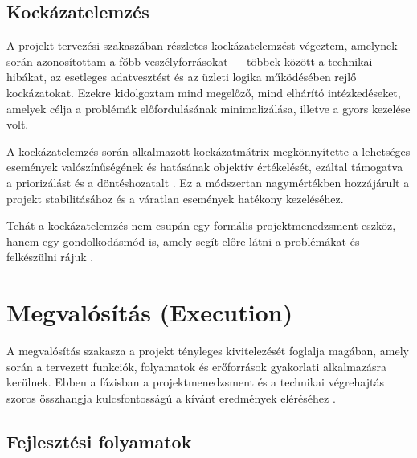 \subsection{Kockázatelemzés}

A projekt tervezési szakaszában részletes kockázatelemzést végeztem, amelynek során azonosítottam a főbb veszélyforrásokat — többek között a technikai hibákat, 
az esetleges adatvesztést és az üzleti logika működésében rejlő kockázatokat.  
Ezekre kidolgoztam mind megelőző, mind elhárító intézkedéseket, amelyek célja a problémák előfordulásának minimalizálása, illetve a gyors kezelése volt.  

A kockázatelemzés során alkalmazott kockázatmátrix megkönnyítette a lehetséges események valószínűségének és hatásának objektív értékelését, 
ezáltal támogatva a priorizálást és a döntéshozatalt \cite{Kovacs2016,Kaposi2019}.  
Ez a módszertan nagymértékben hozzájárult a projekt stabilitásához és a váratlan események hatékony kezeléséhez.  

Tehát a kockázatelemzés nem csupán egy formális projektmenedzsment-eszköz, hanem egy gondolkodásmód is, 
amely segít előre látni a problémákat és felkészülni rájuk \cite{Hajdu2014,Szalay2018}.

\section{Megvalósítás (Execution)}

A megvalósítás szakasza a projekt tényleges kivitelezését foglalja magában, amely során a tervezett funkciók, 
folyamatok és erőforrások gyakorlati alkalmazásra kerülnek. Ebben a fázisban a projektmenedzsment 
és a technikai végrehajtás szoros összhangja kulcsfontosságú a kívánt eredmények eléréséhez \cite{Hajdu2014,Szalay2018,Kaposi2019}.

\subsection{Fejlesztési folyamatok}

